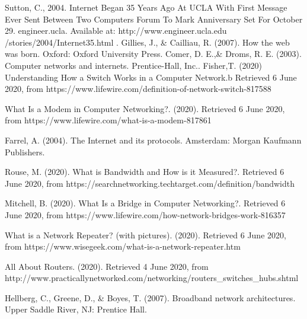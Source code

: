 \documentclass[12pt]{article}
\begin{document}
\begin{thebibliography}{10}
	Sutton, C., 2004. Internet Began 35 Years Ago At UCLA With First Message Ever Sent Between Two Computers Forum To Mark Anniversary Set For October 29. engineer.ucla. Available at: http://www.engineer.ucla.edu\\/stories/2004/Internet35.html .
	Gillies, J., \& Cailliau, R. (2007). How the web was born. Oxford: Oxford University Press.
	Comer, D. E.,\& Droms, R. E. (2003). Computer networks and internets. Prentice-Hall, Inc..
	  Fisher,T. (2020) Understanding How a Switch Works in a Computer Network.b Retrieved 6 June 2020, from https://www.lifewire.com/definition-of-network-switch-817588
	  
	  
	  What Is a Modem in Computer Networking?. (2020). Retrieved 6 June 2020, from https://www.lifewire.com/what-is-a-modem-817861
	
	Farrel, A. (2004). The Internet and its protocols. Amsterdam: Morgan Kaufmann Publishers.
	
	Rouse, M. (2020). What is Bandwidth and How is it Measured?. Retrieved 6 June 2020, from https://searchnetworking.techtarget.com/definition/bandwidth
	
	Mitchell, B. (2020). What Is a Bridge in Computer Networking?. Retrieved 6 June 2020, from https://www.lifewire.com/how-network-bridges-work-816357
	
	What is a Network Repeater? (with pictures). (2020). Retrieved 6 June 2020, from https://www.wisegeek.com/what-is-a-network-repeater.htm
	
	
	All About Routers. (2020). Retrieved 4 June 2020, from http://www.practicallynetworked.com/networking/routers\_switches\_hubs.shtml




	Hellberg, C., Greene, D., \& Boyes, T. (2007). Broadband network architectures. Upper Saddle River, NJ: Prentice Hall.
	
	
	
	
	
	
	\end{thebibliography}




%
\end{document}
